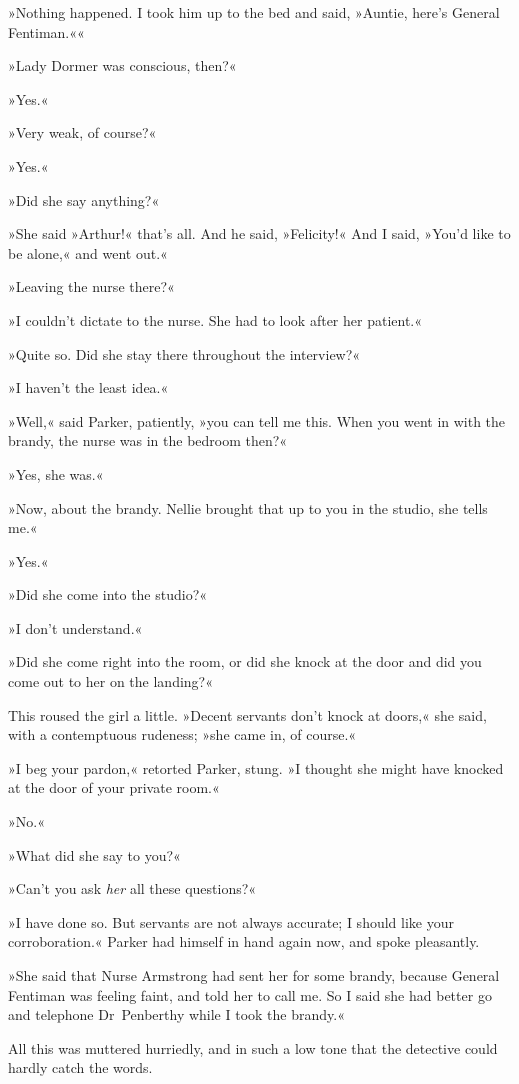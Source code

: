 »Nothing happened. I took him up to the bed and said, »Auntie, here's General Fentiman.««

»Lady Dormer was conscious, then?«

»Yes.«

»Very weak, of course?«

»Yes.«

»Did she say anything?«

»She said »Arthur!« that's all. And he said, »Felicity!« And I said, »You'd like to be alone,« and went out.«

»Leaving the nurse there?«

»I couldn't dictate to the nurse. She had to look after her patient.«

»Quite so. Did she stay there throughout the interview?«

»I haven't the least idea.«

»Well,« said Parker, patiently, »you can tell me this. When you went in with the brandy, the nurse was in the bedroom then?«

»Yes, she was.«

»Now, about the brandy. Nellie brought that up to you in the studio, she tells me.«

»Yes.«

»Did she come into the studio?«

»I don't understand.«

»Did she come right into the room, or did she knock at the door and did you come out to her on the landing?«

This roused the girl a little. »Decent servants don't knock at doors,« she said, with a contemptuous rudeness; »she came in, of course.«

»I beg your pardon,« retorted Parker, stung. »I thought she might have knocked at the door of your private room.«

»No.«

»What did she say to you?«

»Can't you ask \textit{her} all these questions?«

»I have done so. But servants are not always accurate; I should like your corroboration.« Parker had himself in hand again now, and spoke pleasantly.

»She said that Nurse Armstrong had sent her for some brandy, because General Fentiman was feeling faint, and told her to call me. So I said she had better go and telephone Dr~Penberthy while I took the brandy.«

All this was muttered hurriedly, and in such a low tone that the detective could hardly catch the words.

